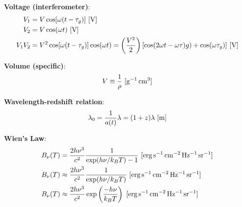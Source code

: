 \documentclass[a4paper,10pt]{article}
\begin{document}
{\noindent}\textbf{Voltage (interferometer)}:
\begin{align*}
    V_1 &= V\cos[\omega(t-\tau_g)] ~ [{\rm V}] \\
    V_2 &= V\cos(\omega t) ~ [{\rm V}] \\
    V_1V_2 &= V^2\cos[\omega(t-\tau_g)]\cos(\omega t) = \left(\frac{V^2}{2}\right) [\cos(2\omega t-\omega \tau)g)+\cos(\omega\tau_g)] ~ [{\rm V}]
\end{align*}

{\noindent}\textbf{Volume (specific)}:
\begin{align*}
    V \equiv \frac{1}{\rho}~ [{\rm g^{-1}\,cm^3}]
\end{align*}

{\noindent}\textbf{Wavelength-redshift relation}:
\begin{align*}
    \lambda_0 = \frac{1}{a(t)}\lambda = (1+z)\lambda ~ [{\rm m}]
\end{align*}

{\noindent}\textbf{Wien's Law}:
\begin{align*}
    B_\nu(T) &= \frac{2h\nu^3}{c^2} \frac{1}{\exp(h\nu/k_BT) - 1} ~ [{\rm erg\,s^{-1}\,cm^{-2}\,Hz^{-1}\,sr^{-1}}] \\
    B_\nu(T) &\approx \frac{2h\nu^3}{c^2} \frac{1}{\exp(h\nu/k_BT)} ~ [{\rm erg\,s^{-1}\,cm^{-2}\,Hz^{-1}\,sr^{-1}}] \\
    B_\nu(T) &\approx \frac{2h\nu^3}{c^2} \exp\left(\frac{-h\nu}{k_BT}\right) ~ [{\rm erg\,s^{-1}\,cm^{-2}\,Hz^{-1}\,sr^{-1}}]
\end{align*}






































\end{document}

